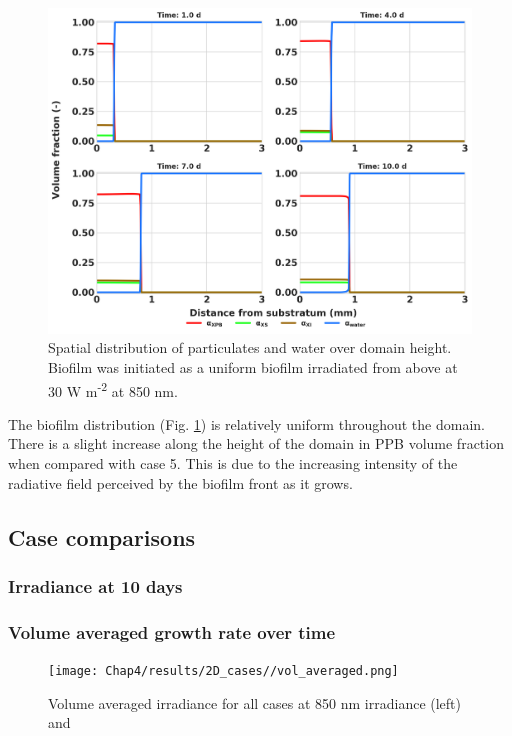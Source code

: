 \begin{figure}[H]
    \centering
    \includegraphics[width=\textwidth,height=0.45\textheight]{Chap4/methods/output/case6.png}
    \caption{Spatial distribution of particulates and water over domain height. Biofilm was initiated as a uniform biofilm irradiated from above at 30 W m\textsuperscript{-2} at 850 nm.} 
    \label{fig:case6_dist_frac}
\end{figure}

The biofilm distribution (Fig. \ref{fig:case6_dist_frac}) is relatively uniform throughout the domain. There is a slight increase along the height of the domain in PPB volume fraction when compared with case 5. This is due to the increasing intensity of the radiative field perceived by the biofilm front as it grows. 

\subsection{Case comparisons}



\subsubsection{Irradiance at 10 days}



\subsubsection{Volume averaged growth rate over time}
\begin{figure}[H]
    \centering
    \texttt{[image: Chap4/results/2D\_cases//vol\_averaged.png]}
    \caption{Volume averaged irradiance for all cases at 850 nm irradiance (left) and } 
    \label{fig:vol_averaged}
\end{figure}



